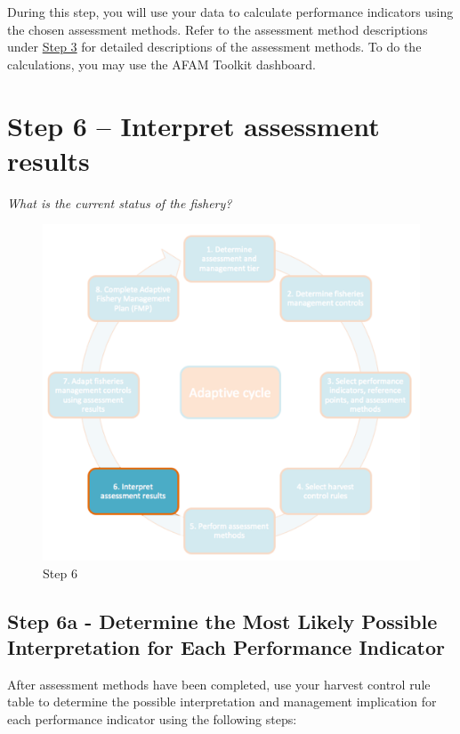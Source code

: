 \documentclass[]{book}
\begin{document}
During this step, you will use your data to calculate performance
indicators using the chosen assessment methods. Refer to the assessment
method descriptions under \protect\hyperlink{Step3}{Step 3} for detailed
descriptions of the assessment methods. To do the calculations, you may
use the AFAM Toolkit dashboard.

\hypertarget{Step6}{\chapter{Step 6 -- Interpret assessment
results}\label{Step6}}

\emph{What is the current status of the fishery?}

\begin{figure}
\centering
\includegraphics{myMediaFolder/media/Step6.png}
\caption{\label{fig:Step6}Step 6}
\end{figure}

\section{Step 6a - Determine the Most Likely Possible Interpretation for
Each Performance
Indicator}\label{step-6a---determine-the-most-likely-possible-interpretation-for-each-performance-indicator}

After assessment methods have been completed, use your harvest control
rule table to determine the possible interpretation and management
implication for each performance indicator using the following steps:
\end{document}
